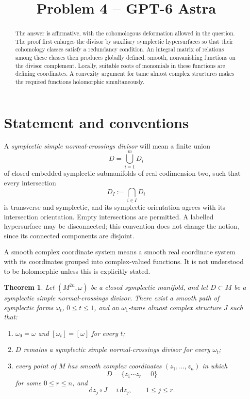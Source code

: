 \documentclass[11pt]{amsart}
\title{Problem 4 -- GPT-6 Astra}
\date{}
\newtheorem{theorem}{Theorem}[section]
\theoremstyle{definition}
\theoremstyle{remark}
\newcommand{\dd}{\mathrm d}
\begin{document}
\begin{abstract}
The answer is affirmative, with the cohomologous deformation allowed in
the question.  The proof first enlarges the divisor by auxiliary
symplectic hypersurfaces so that their cohomology classes satisfy a
redundancy condition.  An integral matrix of relations among these
classes then produces globally defined, smooth, nonvanishing functions
on the divisor complement.  Locally, suitable roots of monomials in
these functions are defining coordinates.  A convexity argument for
tame almost complex structures makes the required functions
holomorphic simultaneously.
\end{abstract}

\maketitle

\section{Statement and conventions}

A \emph{symplectic simple normal-crossings divisor} will mean a finite
union
\[
D=\bigcup_{i=1}^{m}D_i
\]
of closed embedded symplectic submanifolds of real codimension two,
such that every intersection
\[
D_I:=\bigcap_{i\in I}D_i
\]
is transverse and symplectic, and its symplectic orientation agrees
with its intersection orientation.  Empty intersections are permitted.
A labelled hypersurface may be disconnected; this convention does not
change the notion, since its connected components are disjoint.

A smooth complex coordinate system means a smooth real coordinate
system with its coordinates grouped into complex-valued functions.
It is not understood to be holomorphic unless this is explicitly
stated.

\begin{theorem}\label{thm:main}
Let $(M^{2n},\omega)$ be a closed symplectic manifold, and let
$D\subset M$ be a symplectic simple normal-crossings divisor.
There exist a smooth path of symplectic forms $\omega_t$, $0\leq t\leq1$,
and an $\omega_1$-tame almost complex structure $J$ such that:
\begin{enumerate}[label=\textup{(\roman*)}]
\item $\omega_0=\omega$ and $[\omega_t]=[\omega]$ for every $t$;
\item $D$ remains a symplectic simple normal-crossings divisor for
      every $\omega_t$;
\item every point of $M$ has smooth complex coordinates
      $(z_1,\ldots,z_n)$ in which
      \[
      D=\{z_1\cdots z_r=0\}
      \]
      for some $0\leq r\leq n$, and
      \[
      \dd z_j\circ J=i\,\dd z_j,\qquad 1\leq j\leq r.
      \]
\end{enumerate}
\end{theorem}
\end{document}
